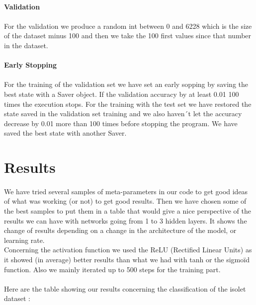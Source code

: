 \documentclass[a4paper]{report}
\begin{document}
\paragraph{Validation}
\paragraph{}For the validation we produce a random int between 0 and 6228 which is the size of the dataset minus 100 and then we take the 100 first values since that number in the dataset. 
\paragraph{Early Stopping}
\paragraph{}For the training of the validation set we have set an early sopping by saving the best state with a Saver object. If the validation accuracy by at least 0.01 100 times the execution stops. For the training with the test set we have restored the state saved in the validation set training and we also haven´t let the accuracy decrease by 0.01 more than 100 times before stopping the program. We have saved the best state with another Saver. 
\section{Results}
\paragraph{}
We have tried several samples of meta-parameters in our code to get good ideas of what was working (or not) to get good results. Then we have chosen some of the best samples to put them in a table that would give a nice perspective of the results we can have with networks going from 1 to 3 hidden layers. It shows the change of results depending on a change in the architecture of the model, or learning rate.
\\Concerning the activation function we used the ReLU (Rectified Linear Units) as it showed (in average) better results than what we had with tanh or the sigmoïd function. Also we mainly iterated up to 500 steps for the training part.

\paragraph{}Here are the table showing our results concerning the classification of the isolet dataset :
\end{document}
